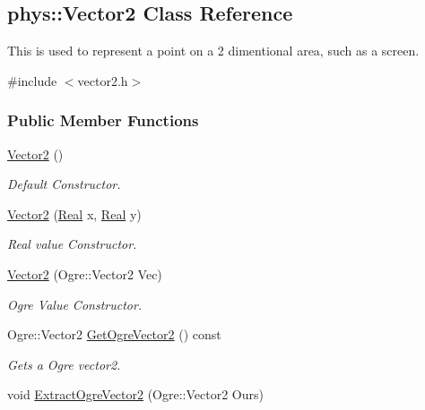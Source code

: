 \hypertarget{classphys_1_1Vector2}{
\subsection{phys::Vector2 Class Reference}
\label{d0/d2c/classphys_1_1Vector2}
}


This is used to represent a point on a 2 dimentional area, such as a screen.  




{\ttfamily \#include $<$vector2.h$>$}

\subsubsection*{Public Member Functions}
\begin{DoxyCompactItemize}
\item 
\hyperlink{classphys_1_1Vector2_a1e9c6000e5acd162a49836414a27bac7}{Vector2} ()
\begin{DoxyCompactList}\small\item\em Default Constructor. \item\end{DoxyCompactList}\item 
\hyperlink{classphys_1_1Vector2_ae8d3c95a5a60d12e706739cbadf01ffb}{Vector2} (\hyperlink{namespacephys_af7eb897198d265b8e868f45240230d5f}{Real} x, \hyperlink{namespacephys_af7eb897198d265b8e868f45240230d5f}{Real} y)
\begin{DoxyCompactList}\small\item\em Real value Constructor. \item\end{DoxyCompactList}\item 
\hyperlink{classphys_1_1Vector2_af3dbb91ef994e19b68c84e4e26eafac3}{Vector2} (Ogre::Vector2 Vec)
\begin{DoxyCompactList}\small\item\em Ogre Value Constructor. \item\end{DoxyCompactList}\item 
Ogre::Vector2 \hyperlink{classphys_1_1Vector2_adc6efedbdfdca596b719decc87ee2e4b}{GetOgreVector2} () const 
\begin{DoxyCompactList}\small\item\em Gets a Ogre vector2. \item\end{DoxyCompactList}\item 
void \hyperlink{classphys_1_1Vector2_af12824b786ce4b91443b5dbd700dfd58}{ExtractOgreVector2} (Ogre::Vector2 Ours)

\end{DoxyCompactItemize}
